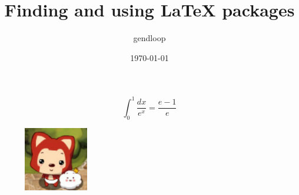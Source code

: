 \documentclass[12pt, a4paper]{article}
\title{Finding and using LaTeX packages}
\author{gendloop}
\date{\today}
\begin{document}
\maketitle
\tableofcontents

\[ \int_0^1 \frac{dx}{e^x} =  \frac{e-1}{e} \]

\begin{figure}
    \centering
    \includegraphics[width=0.25\textwidth]{figures/favicon.png}

\end{figure}
\end{document}
